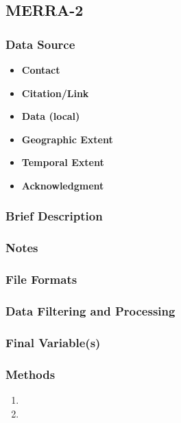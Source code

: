 \subsection{MERRA-2}

\subsubsection*{Data Source}

\begin{itemize}[nolistsep]
\item \textbf{Contact} 
\item \textbf{Citation/Link} 
\item \textbf{Data (local)} 
\item \textbf{Geographic Extent} 
\item \textbf{Temporal Extent} 
\item \textbf{Acknowledgment} 
\end{itemize}

\subsubsection*{Brief Description}


\subsubsection*{Notes}

\subsubsection*{File Formats} 

\subsubsection*{Data Filtering and Processing}

\subsubsection*{Final Variable(s)}

\subsubsection*{Methods}

\begin{enumerate}
\item 
\item
\end{enumerate}


